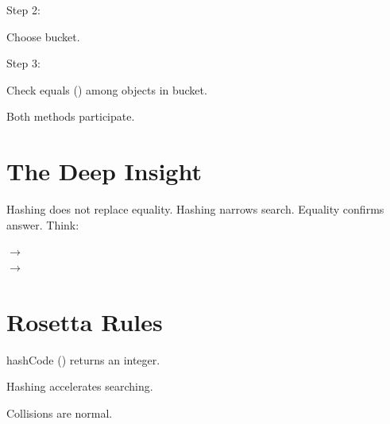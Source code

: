 \documentclass[11pt,a4paper]{book}
\begin{document}

Step 2:

Choose bucket.


Step 3:

Check equals () among
objects in bucket.


Both methods participate.
\section{The Deep Insight}
Hashing does not replace equality.
Hashing narrows search.
Equality confirms answer.
Think:
\begin{center}
 $\rightarrow$  \\
 $\rightarrow$ 
\end{center}
\section{Rosetta Rules}

\begin{rosettarule}

hashCode () returns an integer.

\end{rosettarule}


\begin{rosettarule}

Hashing accelerates searching.

\end{rosettarule}


\begin{rosettarule}

Collisions are normal.

\end{rosettarule}
\end{document}

